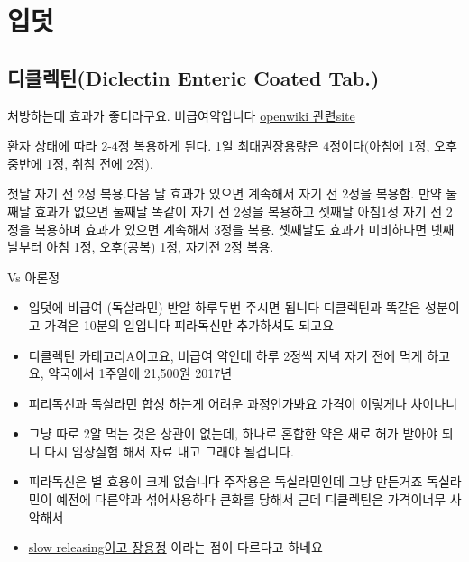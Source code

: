 \section{입덧}
{
}

\subsection{디클렉틴(Diclectin Enteric Coated Tab.)}
처방하는데 효과가 좋더라구요. 비급여약입니다
\href{https://openwiki.kr/med/%EB%94%94%ED%81%B4%EB%A0%89%ED%8B%B4}{openwiki 관련site}\par
{}
환자 상태에 따라 2-4정 복용하게 된다. 1일 최대권장용량은 4정이다(아침에 1정, 오후 중반에 1정, 취침 전에 2정).\par
첫날 자기 전 2정 복용.다음 날 효과가 있으면 계속해서 자기 전 2정을 복용함.
만약 둘째날 효과가 없으면 둘째날 똑같이 자기 전 2정을 복용하고 셋째날 아침1정 자기 전 2정을 복용하며 효과가 있으면 계속해서 3정을 복용.
셋째날도 효과가 미비하다면 넷째날부터 아침 1정, 오후(공복) 1정, 자기전 2정 복용. 
\begin{commentbox}{Vs 아론정}
    \begin{itemize}\tightlist
    \item 입덧에  비급여  (독살라민) 반알 하루두번 주시면 됩니다 디클렉틴과 똑같은 성분이고 가격은 10분의 일입니다 피라독신만 추가하셔도 되고요
    \item 디클렉틴 카테고리A이고요, 비급여 약인데 하루 2정씩 저녁 자기 전에 먹게 하고요, 약국에서 1주일에 21,500원 2017년 
    \item 피리독신과 독살라민 합성 하는게 어려운 과정인가봐요 가격이 이렇게나 차이나니 
    \item 그냥 따로 2알 먹는 것은 상관이 없는데, 하나로 혼합한 약은 새로 허가 받아야 되니 다시 임상실험 해서 자료 내고 그래야 될겁니다.
    \item 피라독신은 별 효용이 크게 없습니다 주작용은 독실라민인데 그냥 만든거죠 독실라민이 예전에 다른약과 섞어사용하다 큰화를 당해서 근데 디클렉틴은 가격이너무 사악해서
    \item \uline{slow releasing이고 장용정} 이라는 점이 다르다고 하네요
    \end{itemize}
\end{commentbox}

